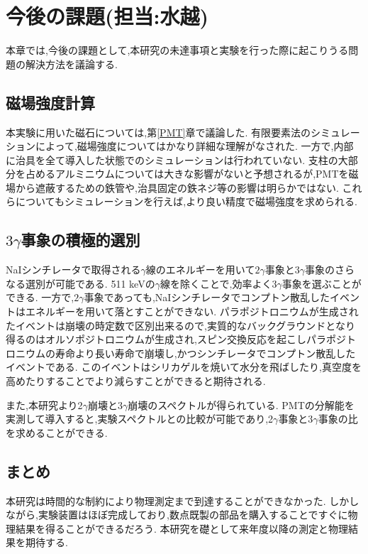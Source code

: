 \chapter{今後の課題(担当:水越)}\label{prospect}

本章では,今後の課題として,本研究の未達事項と実験を行った際に起こりうる問題の解決方法を議論する.

\section{磁場強度計算}
本実験に用いた磁石については,第\ref{PMT}章で議論した.
有限要素法のシミュレーションによって,磁場強度についてはかなり詳細な理解がなされた.
一方で,内部に治具を全て導入した状態でのシミュレーションは行われていない.
支柱の大部分を占めるアルミニウムについては大きな影響がないと予想されるが,PMTを磁場から遮蔽するための鉄管や,治具固定の鉄ネジ等の影響は明らかではない.
これらについてもシミュレーションを行えば,より良い精度で磁場強度を求められる.

\section{$3\gamma$事象の積極的選別}
NaIシンチレータで取得される$\gamma$線のエネルギーを用いて$2\gamma$事象と$3\gamma$事象のさらなる選別が可能である.
511 keVの$\gamma$線を除くことで,効率よく$3\gamma$事象を選ぶことができる.
一方で,$2\gamma$事象であっても,NaIシンチレータでコンプトン散乱したイベントはエネルギーを用いて落とすことができない.
パラポジトロニウムが生成されたイベントは崩壊の時定数で区別出来るので,実質的なバックグラウンドとなり得るのはオルソポジトロニウムが生成され,スピン交換反応を起こしパラポジトロニウムの寿命より長い寿命で崩壊し,かつシンチレータでコンプトン散乱したイベントである.
このイベントはシリカゲルを焼いて水分を飛ばしたり,真空度を高めたりすることでより減らすことができると期待される.

また,本研究より2$\gamma$崩壊と3$\gamma$崩壊のスペクトルが得られている.
PMTの分解能を実測して導入すると,実験スペクトルとの比較が可能であり,2$\gamma$事象と3$\gamma$事象の比を求めることができる.

\section{まとめ}
本研究は時間的な制約により物理測定まで到達することができなかった.
しかしながら,実験装置はほぼ完成しており,数点既製の部品を購入することですぐに物理結果を得ることができるだろう.
本研究を礎として来年度以降の測定と物理結果を期待する.
